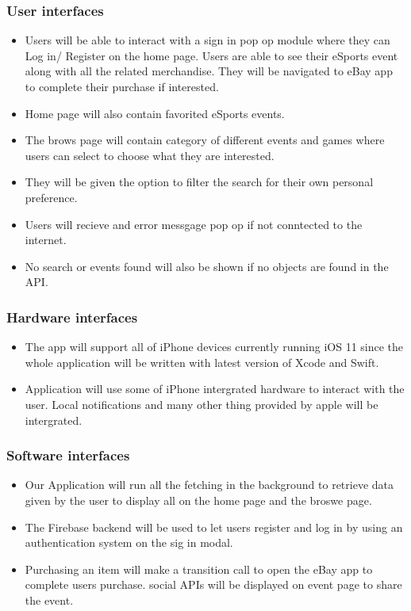\documentclass[onecolumn, draftclsnofoot,10pt, compsoc]{IEEEtran}
\begin{document}
\subsubsection{User interfaces}
\begin{itemize}
\item Users will be able to interact with a sign in pop op module where they can Log in/ Register on the home page. Users are able to see their eSports event along with all the related merchandise. They will be navigated to eBay app to complete their purchase if interested.
\item Home page will also contain favorited eSports events.
\item The brows page will contain category of different events and games where users can select to choose what they are interested.
\item They will be given the option to filter the search for their own personal preference.
\item Users will recieve and error messgage pop op if not conntected to the internet.
\item No search or events found will also be shown if no objects are found in the API. 
\end{itemize}


\subsubsection{Hardware interfaces}
\begin{itemize}
\item The app will support all of iPhone devices currently running iOS 11 since the whole application will be written with latest version of Xcode and Swift.
\item Application will use some of iPhone intergrated hardware to interact with the user. Local notifications and many other thing provided by apple will be intergrated.
\end{itemize}

\subsubsection{Software interfaces}
\begin{itemize}
\item Our Application will run all the fetching in the background to retrieve data given by the user to display all on the home page and the broswe page.
\item The Firebase backend will be used to let users register and log in by using an authentication system on the sig in modal.
\item Purchasing an item will make a transition call to open the eBay app to complete users purchase. social APIs will be displayed on event page to share the event.
\end{itemize}
\end{document}
